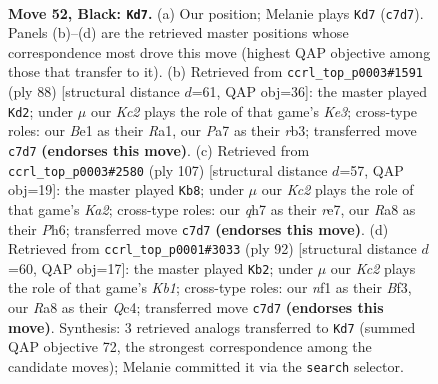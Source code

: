 \documentclass[11pt]{article}
\begin{document}
\clearpage

\begin{figure}[p]\centering
\begin{subfigure}{0.46\textwidth}\centering
\resizebox{\linewidth}{!}{%
\newchessgame
\chessboard[
  setfen={r5r1/p1k3pQ/7p/3p3P/pq1P2P1/4P3/6K1/4bN2 b - - 13 52},
  showmover=false,
  pgfstyle=straightmove, color=movearrow, markmove={c7-d7}
]}
\caption{}
\end{subfigure}\hfill
\begin{subfigure}{0.46\textwidth}\centering
\resizebox{\linewidth}{!}{%
\newchessgame
\chessboard[
  setfen={6k1/R1p3p1/2Pp4/3P3p/5Q1P/1r2K1Pq/8/R7 w - - 3 45},
  showmover=false,
  pgfstyle=straightmove, color=movearrow, markmove={e3-d2}
]}
\caption{}
\end{subfigure}
\\[4pt]
\begin{subfigure}{0.46\textwidth}\centering
\resizebox{\linewidth}{!}{%
\newchessgame
\chessboard[
  setfen={2r5/k1p1R3/3p3p/Q1pP4/2P3q1/P4p2/1P6/1K6 b - - 5 54},
  showmover=false,
  pgfstyle=straightmove, color=movearrow, markmove={a7-b8}
]}
\caption{}
\end{subfigure}\hfill
\begin{subfigure}{0.46\textwidth}\centering
\resizebox{\linewidth}{!}{%
\newchessgame
\chessboard[
  setfen={8/q4ppk/2b1pn2/7p/2QRPP1P/5BP1/8/1K6 w - - 6 47},
  showmover=false,
  pgfstyle=straightmove, color=movearrow, markmove={b1-b2}
]}
\caption{}
\end{subfigure}
\caption{\textbf{Move 52, Black: \texttt{Kd7}.} (a) Our position; Melanie plays \texttt{Kd7} (\texttt{c7d7}). Panels (b)--(d) are the retrieved master positions whose correspondence most drove this move (highest QAP objective among those that transfer to it). (b) Retrieved from \texttt{ccrl\_top\_p0003\#1591} (ply 88) [structural distance $d$=61, QAP obj=36]: the master played \texttt{Kd2}; under $\mu$ our \emph{Kc2} plays the role of that game's \emph{Ke3}; cross-type roles: our \emph{B}e1 as their \emph{R}a1, our \emph{P}a7 as their \emph{r}b3; transferred move \texttt{c7d7} \textbf{(endorses this move)}. (c) Retrieved from \texttt{ccrl\_top\_p0003\#2580} (ply 107) [structural distance $d$=57, QAP obj=19]: the master played \texttt{Kb8}; under $\mu$ our \emph{Kc2} plays the role of that game's \emph{Ka2}; cross-type roles: our \emph{q}h7 as their \emph{r}e7, our \emph{R}a8 as their \emph{P}h6; transferred move \texttt{c7d7} \textbf{(endorses this move)}. (d) Retrieved from \texttt{ccrl\_top\_p0001\#3033} (ply 92) [structural distance $d$=60, QAP obj=17]: the master played \texttt{Kb2}; under $\mu$ our \emph{Kc2} plays the role of that game's \emph{Kb1}; cross-type roles: our \emph{n}f1 as their \emph{B}f3, our \emph{R}a8 as their \emph{Q}c4; transferred move \texttt{c7d7} \textbf{(endorses this move)}. Synthesis: 3 retrieved analogs transferred to \texttt{Kd7} (summed QAP objective 72, the strongest correspondence among the candidate moves); Melanie committed it via the \texttt{search} selector.}
\label{fig:thought-m103}
\end{figure}
\end{document}
